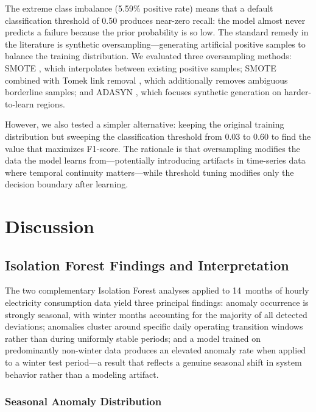 \documentclass{article}
\begin{document}
The extreme class imbalance (5.59\% positive rate) means that a default classification threshold of 0.50 produces near-zero recall: the model almost never predicts a failure because the prior probability is so low. The standard remedy in the literature is synthetic oversampling---generating artificial positive samples to balance the training distribution. We evaluated three oversampling methods: SMOTE \cite{chawla2002smote}, which interpolates between existing positive samples; SMOTE combined with Tomek link removal \cite{batista2004study}, which additionally removes ambiguous borderline samples; and ADASYN \cite{he2008adasyn}, which focuses synthetic generation on harder-to-learn regions.

However, we also tested a simpler alternative: keeping the original training distribution but sweeping the classification threshold from 0.03 to 0.60 to find the value that maximizes F1-score. The rationale is that oversampling modifies the data the model learns from---potentially introducing artifacts in time-series data where temporal continuity matters---while threshold tuning modifies only the decision boundary after learning.




\section{Discussion}\label{sec:discussion}


\subsection{Isolation Forest Findings and Interpretation}

The two complementary Isolation Forest analyses applied to 14~months of hourly
electricity consumption data yield three principal findings: anomaly
occurrence is strongly seasonal, with winter months accounting for the
majority of all detected deviations; anomalies cluster around specific
daily operating transition windows rather than during uniformly stable
periods; and a model trained on predominantly non-winter data produces
an elevated anomaly rate when applied to a winter test period---a
result that reflects a genuine seasonal shift in system behavior rather
than a modeling artifact.

\subsubsection{Seasonal Anomaly Distribution}
\end{document}
